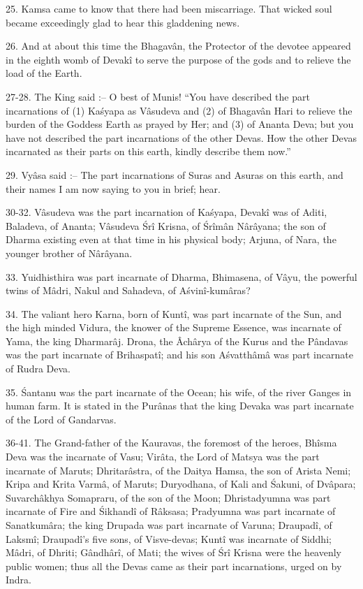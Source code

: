 25. Kamsa came to know that there had been miscarriage. That wicked soul became exceedingly glad to hear this gladdening news.

26. And at about this time the Bhagav\^an, the Protector of the devotee appeared in the eighth womb of Devak\^i to serve the purpose of the gods and to relieve the load of the Earth.

27-28. The King said :-- O best of Munis! ``You have described the part incarnations of (1) Ka\'syapa as V\^asudeva and (2) of Bhagav\^an Hari to relieve the burden of the Goddess Earth as prayed by Her; and (3) of Ananta Deva; but you have not described the part incarnations of the other Devas. How the other Devas incarnated as their parts on this earth, kindly describe them now.''

29. Vy\^asa said :-- The part incarnations of Suras and Asuras on this earth, and their names I am now saying to you in brief; hear.

30-32. V\^asudeva was the part incarnation of Ka\'syapa, Devak\^i was of Aditi, Baladeva, of Ananta; V\^asudeva \'Sr\^i Krisna, of \'Sr\^im\^an N\^ar\^ayana; the son of Dharma existing even at that time in his physical body; Arjuna, of Nara, the younger brother of N\^ar\^ayana.

33. Yuidhisthira was part incarnate of Dharma, Bhimasena, of V\^ayu, the powerful twins of M\^adri, Nakul and Sahadeva, of A\'svin\^i-kum\^aras?

34. The valiant hero Karna, born of Kunt\^i, was part incarnate of the Sun, and the high minded Vidura, the knower of the Supreme Essence, was incarnate of Yama, the king Dharmar\^aj. Drona, the \^Ach\^arya of the Kurus and the P\^andavas was the part incarnate of Brihaspat\^i; and his son A\'svatth\^am\^a was part incarnate of Rudra Deva.

35. \'Santanu was the part incarnate of the Ocean; his wife, of the river Ganges in human farm. It is stated in the Pur\^anas that the king Devaka was part incarnate of the Lord of Gandarvas.

36-41. The Grand-father of the Kauravas, the foremost of the heroes, Bh\^isma Deva was the incarnate of Vasu; Vir\^ata, the Lord of Matsya was the part incarnate of Maruts; Dhritar\^astra, of the Daitya Hamsa, the son of Arista Nemi; Kripa and Krita Varm\^a, of Maruts; Duryodhana, of Kali and \'Sakuni, of Dv\^apara; Suvarch\^akhya Somapraru, of the son of the Moon; Dhristadyumna was part incarnate of Fire and \'Sikhand\^i of R\^aksasa; Pradyumna was part incarnate of Sanatkum\^ara; the king Drupada was part incarnate of Varuna; Draupad\^i, of Laksm\^i; Draupad\^i's five sons, of Visve-devas; Kunt\^i was incarnate of Siddhi; M\^adri, of Dhriti; G\^andh\^ar\^i, of Mati; the wives of \'Sr\^i Krisna were the heavenly public women; thus all the Devas came as their part incarnations, urged on by Indra.

